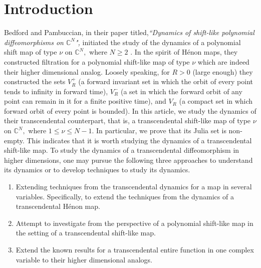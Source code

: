 \documentclass[12pt, reqno]{amsart}
\numberwithin{equation}{section}
\theoremstyle{definition}
\theoremstyle{remark}
\theoremstyle{plain}
\theoremstyle{definition}
\numberwithin{equation}{section}
\begin{document}
\section{Introduction}\label{1}
Bedford and Pambuccian, in their paper titled,\textit{``Dynamics of shift-like polynomial diffeomorphisms on $\mathbb{C}^N$",} initiated the study of the dynamics of a polynomial shift map of type $\nu$ on $\mathbb{C}^N,$ where $N\geq 2$ \cite{Bedford}. In the spirit of H\'enon maps, they constructed filtration for a polynomial shift-like map of type $\nu$ which are indeed their higher dimensional analog. Loosely speaking, for $R>0$ (large enough) they constructed the sets $V_R^+$ (a forward invariant set in which the orbit of every point tends to infinity in forward time), $V_R^-$ (a set in which the forward orbit of any point can remain in it for a finite positive time), and $V_R$ (a compact set in which forward orbit of every point is bounded).
In this article, we study the dynamics of their transcendental counterpart, that is, a transcendental shift-like  map of type $\nu$ on $\mathbb{C}^N,$ where $1\leq\nu\leq N-1.$ In particular, we prove that its Julia set is non-empty. This indicates that it is worth studying the dynamics of a transcendental shift-like map. To study the dynamics of a transcendental diffeomorphism in higher dimensions, one may pursue the following three approaches to understand its dynamics or to develop techniques to study its dynamics.
\begin{enumerate}
\item Extending techniques from the transcendental dynamics for a map in several variables. Specifically, to extend the techniques from the dynamics of a transcendental H\'enon map.
\item Attempt to investigate from the perspective of a polynomial shift-like map in the setting of a transcendental shift-like map. 
\item Extend the known results for a transcendental entire function in one complex variable to their higher dimensional analogs.
\end{enumerate}
\end{document}
